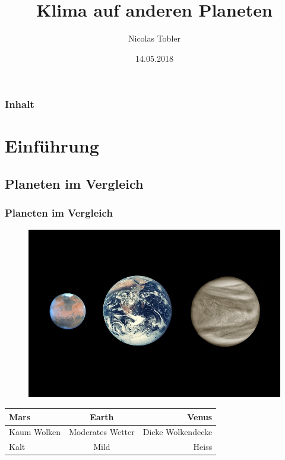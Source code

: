 \documentclass{beamer}
\title{Klima auf anderen Planeten}
\author{Nicolas Tobler}
\institute{Mathematisches Seminar 2018}
\date{14.05.2018}
\begin{document}
\begin{frame}
\titlepage
\end{frame}

\begin{frame}
\frametitle{Inhalt}
\tableofcontents
\end{frame}

\section{Einführung}

\subsection{Planeten im Vergleich}
\begin{frame}
	\frametitle{Planeten im Vergleich}
	
	\begin{figure}
	\center
	\includegraphics[width=0.7\linewidth, trim={0 3cm 0 3cm},clip]{planets.jpg}
	\end{figure}
	
\begin{center}
\begin{tabular}{ l c r }
  Mars & Earth & Venus \\
  \hline
  Kaum Wolken & Moderates Wetter & Dicke Wolkendecke \\
  Kalt & Mild & Heiss \\
\end{tabular}
\end{center}	
	

\end{frame}
\end{document}

